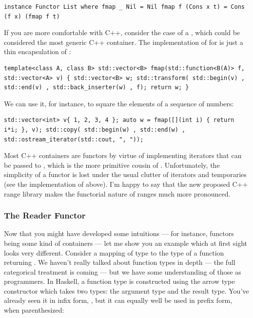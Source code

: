 \begin{verbatim}
instance Functor List where fmap _ Nil = Nil fmap f (Cons x t) = Cons (f x) (fmap f t)
\end{verbatim}

If you are more comfortable with C++, consider the case of a
, which could be considered the most generic C++
container. The implementation of  for 
is just a thin encapsulation of :

\begin{verbatim}
template<class A, class B> std::vector<B> fmap(std::function<B(A)> f, std::vector<A> v) { std::vector<B> w; std::transform( std::begin(v) , std::end(v) , std::back_inserter(w) , f); return w; }
\end{verbatim}

We can use it, for instance, to square the elements of a sequence of
numbers:

\begin{verbatim}
std::vector<int> v{ 1, 2, 3, 4 }; auto w = fmap([](int i) { return i*i; }, v); std::copy( std::begin(w) , std::end(w) , std::ostream_iterator(std::cout, ", "));
\end{verbatim}

Most C++ containers are functors by virtue of implementing iterators
that can be passed to , which is the more
primitive cousin of . Unfortunately, the simplicity of a
functor is lost under the usual clutter of iterators and temporaries
(see the implementation of  above). I'm happy to say that
the new proposed C++ range library makes the functorial nature of ranges
much more pronounced.

\subsubsection{The Reader Functor}\label{the-reader-functor}

Now that you might have developed some intuitions --- for instance,
functors being some kind of containers --- let me show you an example
which at first sight looks very different. Consider a mapping of type
 to the type of a function returning . We haven't
really talked about function types in depth --- the full categorical
treatment is coming --- but we have some understanding of those as
programmers. In Haskell, a function type is constructed using the arrow
type constructor \code{(-\textgreater{})} which takes two types: the
argument type and the result type. You've already seen it in infix form,
, but it can equally well be used in prefix
form, when parenthesized:


